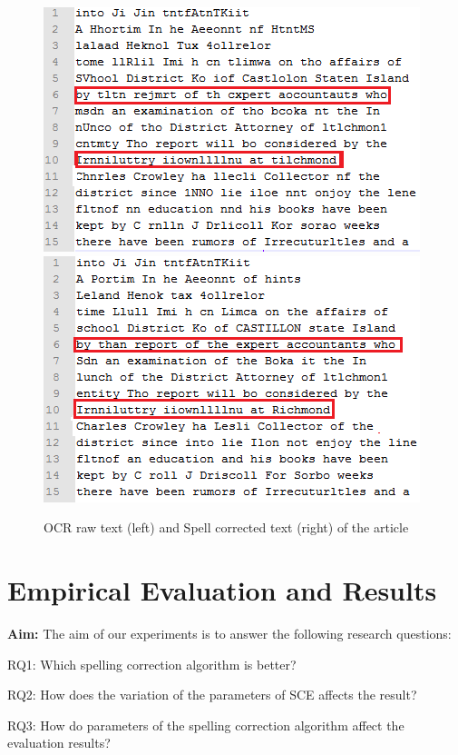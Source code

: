\documentclass[preprint,11pt]{elsarticle}
\begin{document}
\begin{figure}[!htb]
\includegraphics[scale=0.75]{ocr3}
\includegraphics[scale=0.75]{corrected3}
\caption{OCR raw text (left) and Spell corrected text (right) of the article}
\label{figure:4}
\end{figure} 

\section{Empirical Evaluation and Results}
\label{spell:results}


\noindent \textbf{Aim: }The aim of our experiments is to answer the following research questions:

RQ1: Which spelling correction algorithm is better? %

RQ2: How does the variation of the parameters of SCE affects the result? %

RQ3: How do parameters of the spelling correction algorithm affect the evaluation results?
\end{document}
